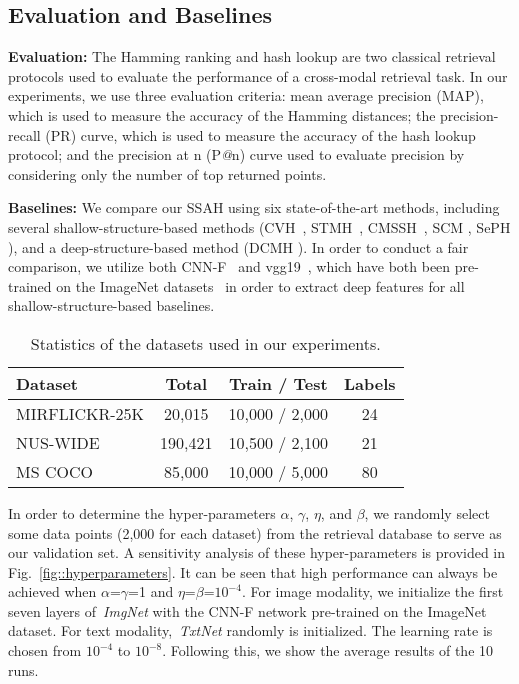 \documentclass[10pt,twocolumn,letterpaper]{article}
\begin{document}
\subsection{Evaluation and Baselines}
\vspace{-0.15cm}
\textbf{Evaluation:} The Hamming ranking and hash lookup are two classical retrieval protocols used to evaluate the performance of a cross-modal retrieval task. In our experiments, we use three evaluation criteria: mean average precision (MAP), which is used to measure the accuracy of the Hamming distances; the precision-recall (PR) curve, which is used to measure the accuracy of the hash lookup protocol; and the precision at n (P\emph{@}n) curve used to evaluate precision by considering only the number of top returned points.

\textbf{Baselines:} We compare our SSAH using six state-of-the-art methods, including  several shallow-structure-based methods (CVH~\cite{Kumar2011Learning}, STMH~\cite{Wang2015Semantic}, CMSSH~\cite{Bronstein2010Data}, SCM \cite{Zhang2014Large}, SePH \cite{Lin2015CVPR}), and a deep-structure-based method (DCMH \cite{Jiang2017CVPR}). In order to conduct a fair comparison, we utilize both CNN-F~\cite{chatfield2014return} and vgg19~\cite{simonyan2014very}, which have both been pre-trained on the ImageNet datasets~\cite{russakovsky2015imagenet} in order to extract deep features for all shallow-structure-based baselines.
\begin{table}[!t]
	\centering
	\caption{Statistics of the datasets used in our experiments.}
	\vspace{-0.25cm}
	\label{datasets: all}
	\begin{tabular}{|l|c|c|c|}
		\hline
		Dataset         & Total      & Train  / Test       & Labels\\
		\hline
		MIRFLICKR-25K   &   20,015   &    10,000 / 2,000    & 24     \\
		\hline
		NUS-WIDE        &  190,421   &    10,500 / 2,100    & 21     \\
		\hline
		MS COCO  &   85,000          &    10,000 / 5,000    & 80     \\
		\hline
	\end{tabular}
	\vspace{-0.7cm}
\end{table}

In order to determine the hyper-parameters $\alpha$, $\gamma$, $\eta$, and $\beta$, we randomly select some data points (2,000 for each dataset) from the retrieval database to serve as our validation set. A sensitivity analysis of these hyper-parameters is provided in Fig.~\ref{fig::hyperparameters}. It can be seen that high performance can always be achieved when $\alpha$=$\gamma$=1 and $\eta$=$\beta$=$10^{-4}$. For image modality, we initialize the first seven layers of~\emph{ImgNet} with the CNN-F network pre-trained on the ImageNet dataset. For text modality,~\emph{TxtNet} randomly is initialized. The learning rate is chosen from $10^{-4}$ to $10^{-8}$. Following this, we show the average results of the 10 runs.
\vspace{-0.15cm}
\end{document}
